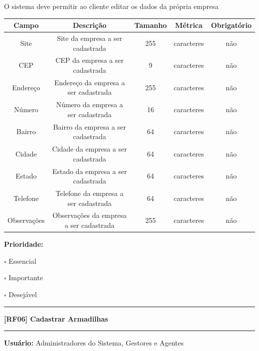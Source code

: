 \documentclass{scrreprt}
\begin{document}
	O sistema deve permitir ao cliente editar os dados da própria empresa
	
	\begin{center}
		\begin{adjustbox}{width=\textwidth}      \begin{tabular}{ |c|c|c|c|c| } 
			\hline
			\rowcolor{lightgray} Campo & Descrição & Tamanho & Métrica & Obrigatório \\   
			\hline
			Site & Site da empresa a ser cadastrada & 255 & caracteres & não \\ 
			\hline
			CEP & CEP da empresa a ser cadastrada & 9 & caracteres & não \\ 
			\hline
			Endereço & Endereço da empresa a ser cadastrada & 255 & caracteres & não \\ 
			\hline
			Número & Número da empresa a ser cadastrada & 16 & caracteres & não \\ 
			\hline
			Bairro & Bairro da empresa a ser cadastrada & 64 & caracteres & não \\ 
			\hline
			Cidade & Cidade da empresa a ser cadastrada & 64 & caracteres & não \\ 
			\hline
			Estado & Estado da empresa a ser cadastrada & 64 & caracteres & não \\ 
			\hline
			Telefone & Telefone da empresa a ser cadastrada & 64 & caracteres & não \\ 
			\hline
			Observações & Observações da empresa a ser cadastrada & 255 & caracteres & não \\    
			\hline
		\end{tabular}    \end{adjustbox}
	\end{center}
	
	\textbf{Prioridade: }\begin{itemize*}
		\item[\hspace{1cm}\rlap{\raisebox{0.2ex}{\hspace{0.4ex}\scriptsize \ding{56}}}$\square$]
		Essencial
		\item[\hspace{1cm}$\square$]
		Importante
		\item[\hspace{1cm}$\square$]
		Desejável
	\end{itemize*}
	\begin{center}
		\noindent\rule{16cm}{0.4pt}
		\textbf{[RF06] Cadastrar Armadilhas}
		\noindent\rule{16cm}{0.4pt}
	\end{center}
	\textbf{Usuário:} Administradores do Sistema, Gestores e Agentes
	
\end{document}
